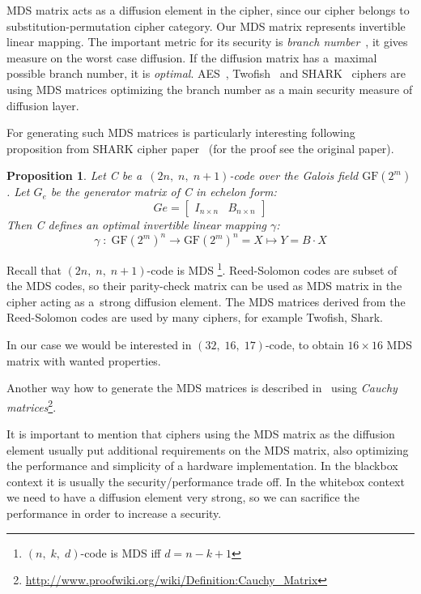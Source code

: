 \documentclass[11pt,oneside,final]{fithesis2}
\newtheorem{myprop}{Proposition}
\begin{document}
    MDS matrix acts as a diffusion element in the cipher, since our cipher belongs to substitution-permutation cipher category. Our MDS matrix 
    represents invertible linear mapping. The important metric for its security is \emph{branch number}~\citep{daemenBranch}, it gives measure on
    the worst case diffusion. If the diffusion matrix has a~maximal possible branch number, it is \emph{optimal}. 
    AES~\citep{2002-daemen}, Twofish~\citep{Schneier98twofish:a} and SHARK~\citep{shark96} ciphers are using MDS matrices optimizing the branch number as 
    a main security measure of diffusion layer.
    
    For generating such MDS matrices is particularly interesting following proposition from SHARK cipher paper~\citep{shark96} (for the proof see
    the original paper).
    
    \begin{myprop}
	Let C be a~$(2n,\; n,\; n+1)$-code over the Galois field $\text{GF}(2^m)$. Let $G_e$  be the generator matrix of C in echelon form:
	\begin{equation}
	   Ge = \begin{bmatrix} I_{n \times n} & B_{n \times n}\end{bmatrix}
	\end{equation}
	Then C defines an optimal invertible linear mapping $\gamma$:
	\begin{equation}
	   \gamma \; : \; \text{GF}(2^m)^n \rightarrow \text{GF}(2^m)^n = X \mapsto Y = B \cdot X
	\end{equation}
    \end{myprop}
    
    Recall that $(2n,\; n,\; n+1)$-code is MDS \footnote{$(n,\;k,\;d)$-code is MDS iff $d=n-k+1$}. Reed-Solomon codes are subset of the MDS codes, so their 
    parity-check matrix can be used as MDS matrix in the cipher acting as a~strong diffusion element. The MDS matrices derived from the Reed-Solomon codes are used by many 
    ciphers, for example Twofish, Shark. 

    In our case we would be interested in $(32,\;16,\;17)$-code, to obtain $16 \times 16$ MDS matrix with wanted properties.
    
    Another way how to generate the MDS matrices is described in~\citep{Roth:1985:GMM:7030.7044} using \emph{Cauchy matrices}\footnote{\url{http://www.proofwiki.org/wiki/Definition:Cauchy_Matrix}}. 

    It is important to mention that ciphers using the MDS matrix as the diffusion element usually put additional requirements on the MDS matrix, also optimizing
    the performance and simplicity of a hardware implementation. In the blackbox context it is usually the security/performance trade off. In the whitebox context we need
    to have a diffusion element very strong, so we can sacrifice the performance in order to increase a security.
    
\end{document}
